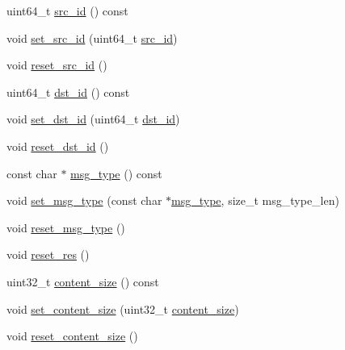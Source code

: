 \begin{DoxyCompactItemize}
\item 
uint64\-\_\-t \hyperlink{classapollo_1_1cyber_1_1message_1_1MessageHeader_a31d59a1e9132a5c9e286c896b9e140d4}{src\-\_\-id} () const 
\item 
void \hyperlink{classapollo_1_1cyber_1_1message_1_1MessageHeader_ab4253dccbe0c9e613c20345a8d98d639}{set\-\_\-src\-\_\-id} (uint64\-\_\-t \hyperlink{classapollo_1_1cyber_1_1message_1_1MessageHeader_a31d59a1e9132a5c9e286c896b9e140d4}{src\-\_\-id})
\item 
void \hyperlink{classapollo_1_1cyber_1_1message_1_1MessageHeader_a5a668772eeb29055f196c718424e228a}{reset\-\_\-src\-\_\-id} ()
\item 
uint64\-\_\-t \hyperlink{classapollo_1_1cyber_1_1message_1_1MessageHeader_a873ac84249a1bc4a1b9523ec0f67eaed}{dst\-\_\-id} () const 
\item 
void \hyperlink{classapollo_1_1cyber_1_1message_1_1MessageHeader_a554ef650d172753151075acd2575c0d4}{set\-\_\-dst\-\_\-id} (uint64\-\_\-t \hyperlink{classapollo_1_1cyber_1_1message_1_1MessageHeader_a873ac84249a1bc4a1b9523ec0f67eaed}{dst\-\_\-id})
\item 
void \hyperlink{classapollo_1_1cyber_1_1message_1_1MessageHeader_a3159a2a21048431ef64e4a6c9c49c537}{reset\-\_\-dst\-\_\-id} ()
\item 
const char $\ast$ \hyperlink{classapollo_1_1cyber_1_1message_1_1MessageHeader_a288834adb4d393378e80f851dbb40467}{msg\-\_\-type} () const 
\item 
void \hyperlink{classapollo_1_1cyber_1_1message_1_1MessageHeader_a57c7f03d660ec4c89800f3e68d464051}{set\-\_\-msg\-\_\-type} (const char $\ast$\hyperlink{classapollo_1_1cyber_1_1message_1_1MessageHeader_a288834adb4d393378e80f851dbb40467}{msg\-\_\-type}, size\-\_\-t msg\-\_\-type\-\_\-len)
\item 
void \hyperlink{classapollo_1_1cyber_1_1message_1_1MessageHeader_a6ac9b54c79ea606b9c3559790081cb67}{reset\-\_\-msg\-\_\-type} ()
\item 
void \hyperlink{classapollo_1_1cyber_1_1message_1_1MessageHeader_a9708f674f9f0a8255f8c9cd9806351bb}{reset\-\_\-res} ()
\item 
uint32\-\_\-t \hyperlink{classapollo_1_1cyber_1_1message_1_1MessageHeader_ad00ad3dbaf22ee8f2eb8bb9b3c156162}{content\-\_\-size} () const 
\item 
void \hyperlink{classapollo_1_1cyber_1_1message_1_1MessageHeader_a6c2f3d9888d5ef0d1598cb02e2aece96}{set\-\_\-content\-\_\-size} (uint32\-\_\-t \hyperlink{classapollo_1_1cyber_1_1message_1_1MessageHeader_ad00ad3dbaf22ee8f2eb8bb9b3c156162}{content\-\_\-size})
\item 
void \hyperlink{classapollo_1_1cyber_1_1message_1_1MessageHeader_a1fe15c266854b18bb81d71bb8f85f35d}{reset\-\_\-content\-\_\-size} ()
\end{DoxyCompactItemize}
